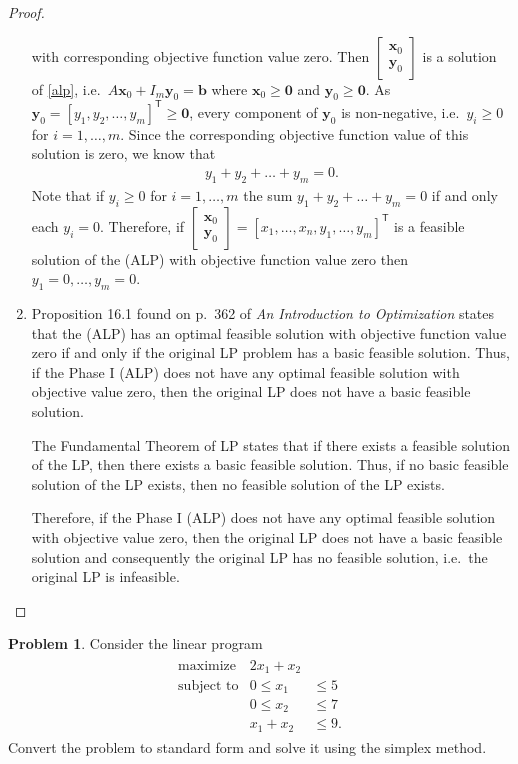 \documentclass[12pt]{article}
\theoremstyle{definition}
\newtheorem{problem}{Problem}
\newcommand{\vect}[1]{\boldsymbol{#1}}
\newcommand{\tran}{\mathsf{T}}
\begin{document}
\begin{proof}
\begin{enumerate}
      with corresponding objective function value zero. Then
      $\begin{bmatrix}\vect{x}_0 \\ \vect{y}_0\end{bmatrix}$ is a solution of
      \eqref{alp}, i.e.\ $A\vect{x}_0 + I_m\vect{y}_0 = \vect{b}$ where
      $\vect{x}_0 \geq \vect{0}$ and $\vect{y}_0 \geq \vect{0}$.
      As $\vect{y}_0 = [y_1, y_2, \dots, y_m]^\tran \geq \vect{0}$, every
      component of $\vect{y}_0$ is non-negative, i.e.\ $y_i \geq 0$ for
      $i=1,\dots,m$. Since the corresponding objective function value of this
      solution is zero, we know that
      \begin{align*}
        y_1 + y_2 + \dots + y_m = 0.
      \end{align*}
      Note that if $y_i \geq 0$ for $i = 1, \dots, m$ the sum $y_1 + y_2 + \dots + y_m = 0$
      if and only each $y_i = 0$. Therefore, if
      $\begin{bmatrix}\vect{x}_0 \\ \vect{y}_0\end{bmatrix} = [x_1, \dots, x_n, y_1, \dots, y_m]^\tran$
      is a feasible solution of the (ALP) with objective function value zero
      then $y_1 = 0, \dots, y_m = 0$.
    \item Proposition 16.1 found on p.\ 362 of \textit{An Introduction to Optimization}
      states that the (ALP) has an optimal feasible solution with objective
      function value zero if and only if the original LP problem has a basic feasible solution.
      Thus, if the Phase I (ALP) does not have any optimal feasible solution with objective value zero,
      then the original LP does not have a basic feasible solution.

      The Fundamental Theorem of LP states that if there exists a feasible solution
      of the LP, then there exists a basic feasible solution. Thus, if no basic
      feasible solution of the LP exists, then no feasible solution of the LP exists.

      Therefore, if the Phase I (ALP) does not have any optimal feasible solution
      with objective value zero, then the original LP does not have a basic feasible
      solution and consequently the original LP has no feasible solution, i.e.\ the original LP
      is infeasible.
  \end{enumerate}
\end{proof}
\newpage


\begin{problem}
  Consider the linear program
  \begin{align*}
    \begin{array}{rrl}
      \text{maximize} & 2x_1 + x_2 &\\
      \text{subject to} & 0 \leq x_1 &\leq 5 \\
      & 0 \leq x_2 &\leq 7 \\
      & x_1 + x_2 &\leq 9.
    \end{array}
  \end{align*}
  Convert the problem to standard form and solve it using the simplex method.
\end{problem}
\end{document}
